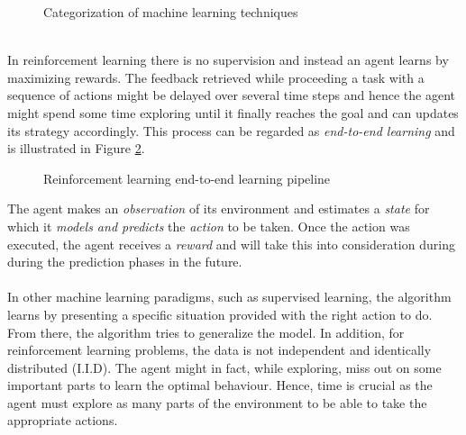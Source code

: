 \begin{figure}[H]
    \centering
    \caption{Categorization of machine learning techniques}
    \label{fig:ml-rl}
\end{figure}
\hfill
\\
In reinforcement learning there is no supervision and instead an agent learns by maximizing rewards.
The feedback retrieved while proceeding a task with a sequence of actions might be delayed over several time steps and hence the agent might spend some time exploring until it finally reaches the goal and can updates its strategy accordingly.
This process can be regarded as \textit{end-to-end learning} and is illustrated in Figure \ref{fig:rl-pipeline}.
\begin{figure}[H]
    \centering
    \caption{Reinforcement learning end-to-end learning pipeline}
    \label{fig:rl-pipeline}
\end{figure}
The agent makes an \textit{observation} of its environment and estimates a \textit{state} for which it \textit{models and predicts} the \textit{action} to be taken.
Once the action was executed, the agent receives a \textit{reward} and will take this into consideration during during the prediction phases in the future. 
\hfill
\\
\\
In other machine learning paradigms, such as supervised learning, the algorithm learns by presenting a specific situation provided with the right action to do. 
From there, the algorithm tries to generalize the model.
In addition, for reinforcement learning problems, the data is not independent and identically distributed (I.I.D). 
The agent might in fact, while exploring, miss out on some important parts to learn the optimal behaviour. 
Hence, time is crucial as the agent must explore as many parts of the environment to be able to take the appropriate actions. \cite{rl-demystified}

